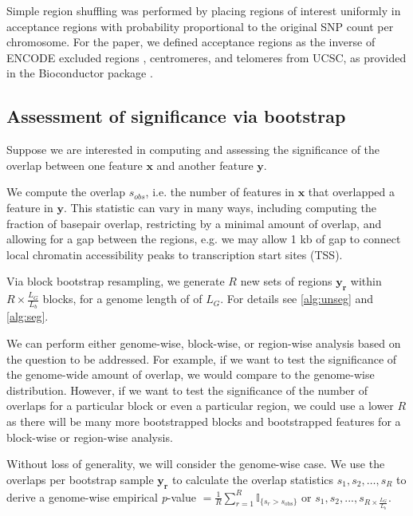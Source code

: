 \documentclass{article}
\begin{document}
Simple region shuffling was performed by placing regions of interest
uniformly in acceptance regions with probability proportional to the
original SNP count per chromosome. For the paper, we defined
acceptance regions as the inverse of
ENCODE excluded regions ,
centromeres, and telomeres from UCSC,
as provided in the  Bioconductor package
\citep{excluderanges}.

\subsection{Assessment of significance via bootstrap}

Suppose we are interested in computing and assessing the significance
of the overlap between one feature
$\bm{x}$ and another feature $\bm{y}$.

We compute the overlap $s_{obs}$, i.e. the number of 
features in $\bm{x}$ that overlapped a feature in $\bm{y}$.
This statistic can vary in many ways, including computing the fraction of
basepair overlap, restricting by a minimal amount of overlap, and
allowing for a gap between the regions, e.g. we may allow 1 kb of gap
to connect local chromatin accessibility peaks to transcription start
sites (TSS).

Via block bootstrap resampling, we generate $R$ new
sets of regions $\bm{y_r}$ within $R \times \frac{L_G}{L_b}$ blocks, for
a genome length of of $L_G$.
For details see \cref{alg:unseg} and \cref{alg:seg}.

We can perform either genome-wise, block-wise, or region-wise analysis
based on the question to be addressed. For example, if we want to test
the significance of the genome-wide amount of overlap, we would compare
to the genome-wise distribution. However, if we want to
test the significance of the number of overlaps for a particular
block or even a particular region, we could use a lower $R$ as there
will be many more bootstrapped blocks and bootstrapped features for a
block-wise or region-wise analysis.

Without loss of generality, we will consider the genome-wise case.
We use the overlaps per bootstrap sample $\bm{y_r}$ to calculate the
overlap statistics $s_{1}, s_{2}, \dots, s_{R}$
to derive a genome-wise empirical \textit{p}-value
$= \frac{1}{R} \sum_{r=1}^R \mathbb{I}_{\{s_r > s_\text{obs}\}}$ or
$s_{1}, s_{2},..., s_{R\times \frac{L_G}{L_b}}$.
\end{document}
